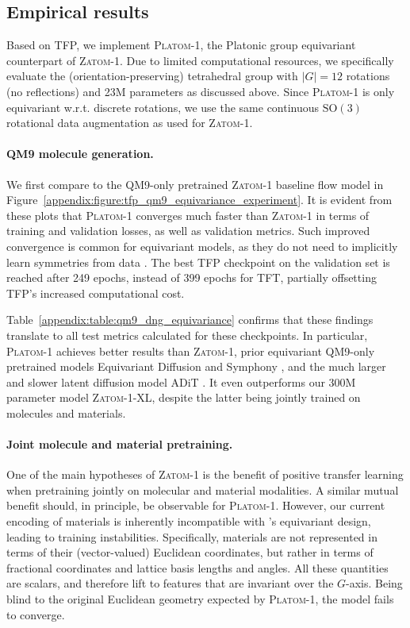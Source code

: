 \documentclass{article}
\theoremstyle{plain}
\theoremstyle{definition}
\theoremstyle{remark}
\begin{document}
\subsection{Empirical results}
\label{appendix:tfp_results}

Based on TFP, we implement \textsc{Platom-1}, the Platonic group equivariant counterpart of \textsc{Zatom-1}. Due to limited computational resources, we specifically evaluate the (orientation-preserving) tetrahedral group with $|G|=12$ rotations (no reflections) and 23M parameters as discussed above. Since \textsc{Platom-1} is only equivariant w.r.t. discrete rotations, we use the same continuous $\mathrm{SO}(3)$ rotational data augmentation as used for \textsc{Zatom-1}.

\paragraph{QM9 molecule generation.}
We first compare to the QM9-only pretrained \textsc{Zatom-1} baseline flow model in Figure~\ref{appendix:figure:tfp_qm9_equivariance_experiment}. It is evident from these plots that \textsc{Platom-1} converges much faster than \textsc{Zatom-1} in terms of training and validation losses, as well as validation metrics. Such improved convergence is common for equivariant models, as they do not need to implicitly learn symmetries from data \citep{weiler2025EquivCoordIndepCNNsWS,zhdanov2024CS-CNNs}. The best TFP checkpoint on the validation set is reached after 249 epochs, instead of 399 epochs for TFT, partially offsetting TFP's increased computational cost.

Table~\ref{appendix:table:qm9_dng_equivariance} confirms that these findings translate to all test metrics calculated for these checkpoints. In particular, \textsc{Platom-1} achieves better results than \textsc{Zatom-1}, prior equivariant QM9-only pretrained models Equivariant Diffusion \citep{hoogeboom2022equivariant} and Symphony \citep{daigavane2024symphony}, and the much larger and slower latent diffusion model ADiT \citep{joshi2025allatom}. It even outperforms our 300M parameter model \textsc{Zatom-1-XL},
despite the latter being jointly trained on molecules and materials.

\paragraph{Joint molecule and material pretraining.}

One of the main hypotheses of \textsc{Zatom-1} is the benefit of positive transfer learning when pretraining jointly on molecular and material modalities. A similar mutual benefit should, in principle, be observable for \textsc{Platom-1}. However, our current encoding of materials is inherently incompatible with 's equivariant design, leading to training instabilities. Specifically, materials are not represented in terms of their (vector-valued) Euclidean coordinates, but rather in terms of fractional coordinates and lattice basis lengths and angles. All these quantities are scalars, and therefore lift to features that are invariant over the $G$-axis. Being blind to the original Euclidean geometry expected by \textsc{Platom-1}, the model fails to converge.
\end{document}
